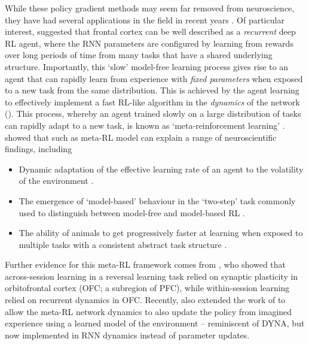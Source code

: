 While these policy gradient methods may seem far removed from neuroscience, they have had several applications in the field in recent years \citep{wang2018prefrontal, jensen2023recurrent, merel2019deep,li2022integrating,song2017reward}.
Of particular interest, \citet{wang2018prefrontal} suggested that frontal cortex can be well described as a \emph{recurrent} deep RL agent, where the RNN parameters are configured by learning from rewards over long periods of time from many tasks that have a shared underlying structure.
Importantly, this `slow' model-free learning process gives rise to an agent that can rapidly learn from experience with \emph{fixed parameters} when exposed to a new task from the same distribution.
This is achieved by the agent learning to effectively implement a fast RL-like algorithm in the \emph{dynamics} of the network ().
This process, whereby an agent trained slowly on a large distribution of tasks can rapidly adapt to a new task, is known as `meta-reinforcement learning' \citep{finn2017model, ritter2018been, duan2016rl, wang2016learning}.
\citet{wang2018prefrontal} showed that such as meta-RL model can explain a range of neuroscientific findings, including
\begin{itemize}
    \item Dynamic adaptation of the effective learning rate of an agent to the volatility of the environment \citep{behrens2007learning}.
    \item The emergence of `model-based' behaviour in the `two-step' task commonly used to distinguish between model-free and model-based RL \citep{miller2017dorsal,daw2011model}.
    \item The ability of animals to get progressively faster at learning when exposed to multiple tasks with a consistent abstract task structure \citep{harlow1949formation}.
\end{itemize}
Further evidence for this meta-RL framework comes from \citet{hattori2023meta}, who showed that across-session learning in a reversal learning task relied on synaptic plasticity in orbitofrontal cortex (OFC; a subregion of PFC), while within-session learning relied on recurrent dynamics in OFC.
Recently, \citet{jensen2023recurrent} also extended the work of \citet{wang2018prefrontal} to allow the meta-RL network dynamics to also update the policy from imagined experience using a learned model of the environment -- reminiscent of DYNA, but now implemented in RNN dynamics instead of parameter updates.

